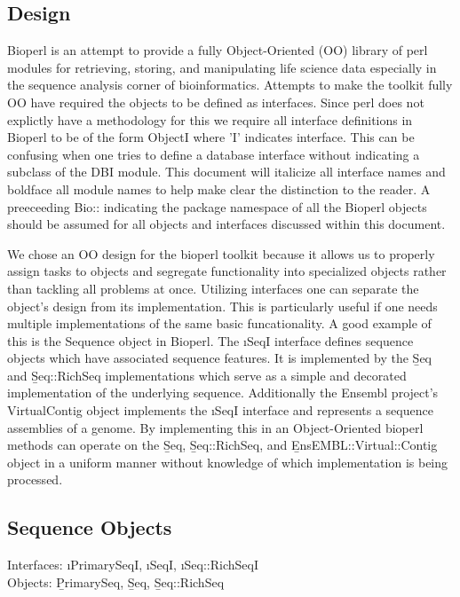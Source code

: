 \documentclass{article}
\begin{document}
\begin{twocolumn}
\section{Design}

Bioperl is an attempt to provide a fully Object-Oriented (OO) library of
perl modules for retrieving, storing, and manipulating life science
data especially in the sequence analysis corner of bioinformatics.
Attempts to make the toolkit fully OO have required the objects to be
defined as interfaces.  Since perl does not explictly have a
methodology for this we require all interface definitions in Bioperl
to be of the form ObjectI where 'I' indicates interface.  This can be
confusing when one tries to define a database interface without
indicating a subclass of the DBI module.  This document will italicize
all interface names and boldface all module names to help make clear
the distinction to the reader.  A preeceeding Bio:: indicating the
package namespace of all the Bioperl objects should be assumed for all
objects and interfaces discussed within this document.  
  
\par

We chose an OO design for the bioperl toolkit because it allows us to
properly assign tasks to objects and segregate functionality into
specialized objects rather than tackling all problems at once.
Utilizing interfaces one can separate the object's design from its
implementation.  This is particularly useful if one needs multiple
implementations of the same basic funcationality.  A good example of
this is the Sequence object in Bioperl. The \i{SeqI} interface
defines sequence objects which have associated sequence features.  It
is implemented by the \b{Seq} and \b{Seq::RichSeq} implementations
which serve as a simple and decorated implementation of the underlying
sequence.  Additionally the Ensembl project's VirtualContig object
implements the \i{SeqI} interface and represents a sequence
assemblies of a genome.  By implementing this in an Object-Oriented
bioperl methods can operate on the \b{Seq}, \b{Seq::RichSeq}, and
\b{EnsEMBL::Virtual::Contig} object in a uniform manner without
knowledge of which implementation is being processed.

\subsection{Sequence Objects}
Interfaces: \i{PrimarySeqI}, \i{SeqI}, \i{Seq::RichSeqI}
\\
Objects: \b{PrimarySeq}, \b{Seq}, \b{Seq::RichSeq}


\end{twocolumn}
\end{document}
